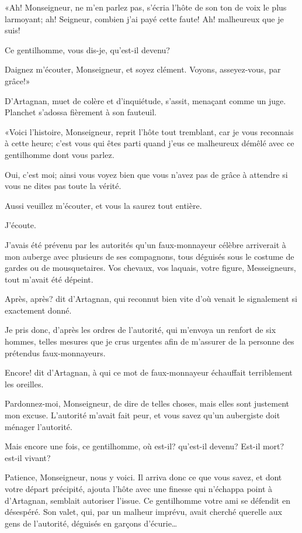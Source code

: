 «Ah! Monseigneur, ne m'en parlez pas, s'écria l'hôte de son ton de voix le plus larmoyant; ah! Seigneur, combien j'ai payé cette faute! Ah! malheureux que je suis! 

\speak  Ce gentilhomme, vous dis-je, qu'est-il devenu? 

\speak  Daignez m'écouter, Monseigneur, et soyez clément. Voyons, asseyez-vous, par grâce!» 

D'Artagnan, muet de colère et d'inquiétude, s'assit, menaçant comme un juge. Planchet s'adossa fièrement à son fauteuil. 

«Voici l'histoire, Monseigneur, reprit l'hôte tout tremblant, car je vous reconnais à cette heure; c'est vous qui êtes parti quand j'eus ce malheureux démêlé avec ce gentilhomme dont vous parlez. 

\speak  Oui, c'est moi; ainsi vous voyez bien que vous n'avez pas de grâce à attendre si vous ne dites pas toute la vérité. 

\speak  Aussi veuillez m'écouter, et vous la saurez tout entière. 

\speak  J'écoute. 

\speak  J'avais été prévenu par les autorités qu'un faux-monnayeur célèbre arriverait à mon auberge avec plusieurs de ses compagnons, tous déguisés sous le costume de gardes ou de mousquetaires. Vos chevaux, vos laquais, votre figure, Messeigneurs, tout m'avait été dépeint. 

\speak  Après, après? dit d'Artagnan, qui reconnut bien vite d'où venait le signalement si exactement donné. 

\speak  Je pris donc, d'après les ordres de l'autorité, qui m'envoya un renfort de six hommes, telles mesures que je crus urgentes afin de m'assurer de la personne des prétendus faux-monnayeurs. 

\speak  Encore! dit d'Artagnan, à qui ce mot de faux-monnayeur échauffait terriblement les oreilles. 

\speak  Pardonnez-moi, Monseigneur, de dire de telles choses, mais elles sont justement mon excuse. L'autorité m'avait fait peur, et vous savez qu'un aubergiste doit ménager l'autorité. 

\speak  Mais encore une fois, ce gentilhomme, où est-il? qu'est-il devenu? Est-il mort? est-il vivant? 

\speak  Patience, Monseigneur, nous y voici. Il arriva donc ce que vous savez, et dont votre départ précipité, ajouta l'hôte avec une finesse qui n'échappa point à d'Artagnan, semblait autoriser l'issue. Ce gentilhomme votre ami se défendit en désespéré. Son valet, qui, par un malheur imprévu, avait cherché querelle aux gens de l'autorité, déguisés en garçons d'écurie\dots 

